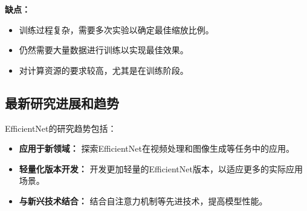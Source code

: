\textbf{缺点：}
\begin{itemize}
    \item 训练过程复杂，需要多次实验以确定最佳缩放比例。
    \item 仍然需要大量数据进行训练以实现最佳效果。
    \item 对计算资源的要求较高，尤其是在训练阶段。
\end{itemize}

\subsection*{最新研究进展和趋势}
EfficientNet的研究趋势包括：
\begin{itemize}
    \item \textbf{应用于新领域：} 探索EfficientNet在视频处理和图像生成等任务中的应用。
    \item \textbf{轻量化版本开发：} 开发更加轻量的EfficientNet版本，以适应更多的实际应用场景。
    \item \textbf{与新兴技术结合：} 结合自注意力机制等先进技术，提高模型性能。
\end{itemize}
